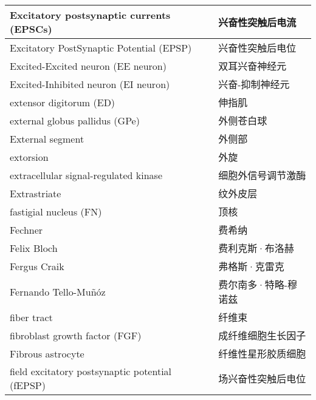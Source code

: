 \begin{longtable}{lll}
	\midrule
	Excitatory postsynaptic currents (EPSCs)     &&  兴奋性突触后电流  \\
	
	\midrule
	Excitatory PostSynaptic Potential (EPSP)     &&  兴奋性突触后电位  \\
	
	\midrule
	Excited-Excited neuron (EE neuron)     &&  双耳兴奋神经元  \\
	
	\midrule
	Excited-Inhibited neuron (EI neuron)     && 兴奋-抑制神经元   \\
	
	\midrule
	extensor digitorum (ED)     && 伸指肌   \\
	
	\midrule
	external globus pallidus (GPe)     && 外侧苍白球   \\
	
	\midrule
	External segment     && 外侧部   \\
	
	\midrule
	extorsion     && 外旋   \\
	
	\midrule
	extracellular signal-regulated kinase     && 细胞外信号调节激酶   \\
	
	\midrule
	Extrastriate     && 纹外皮层   \\
	
	\midrule
	fastigial nucleus (FN)     &&  顶核  \\
	
	\midrule
	Fechner     &&  费希纳  \\
	
	\midrule
	Felix Bloch     &&  费利克斯·布洛赫  \\
	
	\midrule
	Fergus Craik     &&  弗格斯·克雷克  \\
	
	\midrule
	Fernando Tello-Muñóz     &&  费尔南多·特略-穆诺兹  \\
	
	\midrule
	fiber tract     &&  纤维束  \\
	
	\midrule
	fibroblast growth factor (FGF)    &&  成纤维细胞生长因子  \\
	
	\midrule
	Fibrous astrocyte     &&  纤维性星形胶质细胞  \\
	
	\midrule
	field excitatory postsynaptic potential (fEPSP)     &&  场兴奋性突触后电位  \\
	

\end{longtable}
